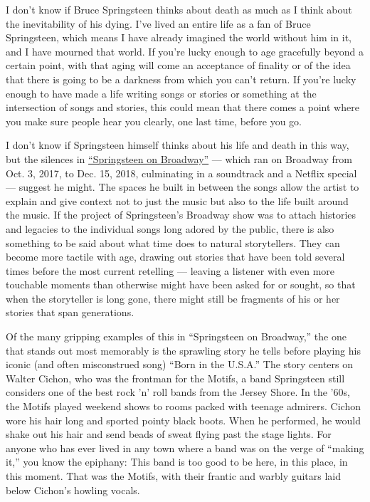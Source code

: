 I don't know if Bruce Springsteen thinks about death as much as I think
about the inevitability of his dying. I've lived an entire life as a fan
of Bruce Springsteen, which means I have already imagined the world
without him in it, and I have mourned that world. If you're lucky enough
to age gracefully beyond a certain point, with that aging will come an
acceptance of finality or of the idea that there is going to be a
darkness from which you can't return. If you're lucky enough to have
made a life writing songs or stories or something at the intersection of
songs and stories, this could mean that there comes a point where you
make sure people hear you clearly, one last time, before you go.

I don't know if Springsteen himself thinks about his life and death in
this way, but the silences in
\href{https://www.nytimes3xbfgragh.onion/2017/10/12/theater/bruce-springsteen-on-broadway-review.html}{``Springsteen
on Broadway''} --- which ran on Broadway from Oct. 3, 2017, to Dec. 15,
2018, culminating in a soundtrack and a Netflix special --- suggest he
might. The spaces he built in between the songs allow the artist to
explain and give context not to just the music but also to the life
built around the music. If the project of Springsteen's Broadway show
was to attach histories and legacies to the individual songs long adored
by the public, there is also something to be said about what time does
to natural storytellers. They can become more tactile with age, drawing
out stories that have been told several times before the most current
retelling --- leaving a listener with even more touchable moments than
otherwise might have been asked for or sought, so that when the
storyteller is long gone, there might still be fragments of his or her
stories that span generations.

Of the many gripping examples of this in ``Springsteen on Broadway,''
the one that stands out most memorably is the sprawling story he tells
before playing his iconic (and often misconstrued song) ``Born in the
U.S.A.'' The story centers on Walter Cichon, who was the frontman for
the Motifs, a band Springsteen still considers one of the best rock 'n'
roll bands from the Jersey Shore. In the '60s, the Motifs played weekend
shows to rooms packed with teenage admirers. Cichon wore his hair long
and sported pointy black boots. When he performed, he would shake out
his hair and send beads of sweat flying past the stage lights. For
anyone who has ever lived in any town where a band was on the verge of
``making it,'' you know the epiphany: This band is too good to be here,
in this place, in this moment. That was the Motifs, with their frantic
and warbly guitars laid below Cichon's howling vocals.

